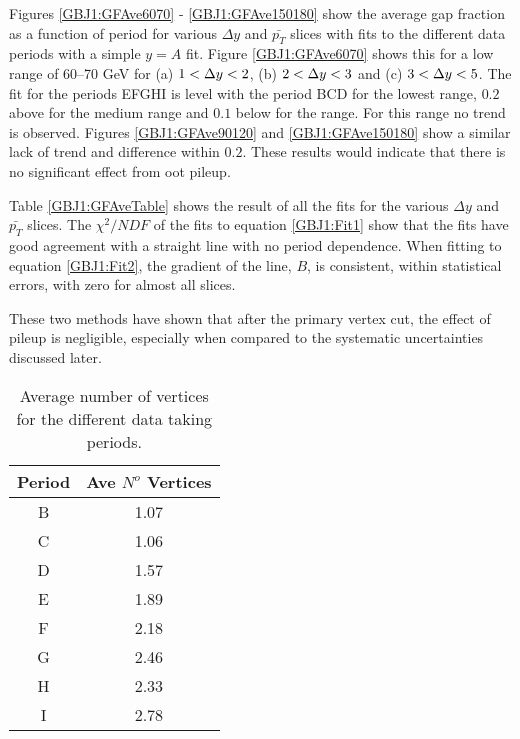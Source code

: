 Figures \ref{GBJ1:GFAve6070} - \ref{GBJ1:GFAve150180} show the average gap fraction as a function of period for various $\Delta y$ and $\bar{p_T}$ slices with fits to the different data periods with a simple $y = A$ fit. 
Figure \ref{GBJ1:GFAve6070} shows this for a low \ptb{} range of 60--70 GeV for (a) $1<\mbox{$\Delta y$}{}<2$, (b) $2<\mbox{$\Delta y$}{}<3$ and (c) $3<\mbox{$\Delta y$}{}<5$.
The fit for the periods EFGHI is level with the period BCD for the lowest \dy{} range, $0.2$ above for the medium \dy{} range and $0.1$ below for the \dy{} range.
For this \ptb{} range no trend is observed.
Figures \ref{GBJ1:GFAve90120} and \ref{GBJ1:GFAve150180} show a similar lack of trend and difference within $0.2$.
These results would indicate that there is no significant effect from oot pileup. 


Table \ref{GBJ1:GFAveTable} shows the result of all the fits for the various $\Delta y$ and $\bar{p_T}$ slices. 
The $\chi^2/NDF$ of the fits to equation \ref{GBJ1:Fit1} show that the fits have good agreement with a straight line with no period dependence.
When fitting to equation \ref{GBJ1:Fit2}, the gradient of the line, $B$, is consistent, within statistical errors, with zero for almost all slices. 


These two methods have shown that after the primary vertex cut, the effect of pileup is negligible, especially when compared to the systematic uncertainties discussed later. 
 
\begin{table}
\begin{center}
\begin{tabular}{|c|c|}
\hline
Period&Ave $N^o$ Vertices\\
\hline
B&1.07\\
C&1.06\\
D&1.57\\
E&1.89\\
F&2.18\\
G&2.46\\
H&2.33\\
I&2.78\\
\hline
\end{tabular}
\caption[Average number of primary vertices for different data periods]{ 
Average number of vertices for the different data taking periods.
\label{GBJ1:VertexAve}}
\end{center}
\end{table}

